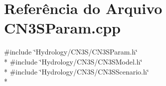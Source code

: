 \section{Referência do Arquivo C\+N3\+S\+Param.\+cpp}
\label{_c_n3_s_param_8cpp}
{\ttfamily \#include \char`\"{}Hydrology/\+C\+N3\+S/\+C\+N3\+S\+Param.\+h\char`\"{}}\\*
{\ttfamily \#include \char`\"{}Hydrology/\+C\+N3\+S/\+C\+N3\+S\+Model.\+h\char`\"{}}\\*
{\ttfamily \#include \char`\"{}Hydrology/\+C\+N3\+S/\+C\+N3\+S\+Scenario.\+h\char`\"{}}\\*
